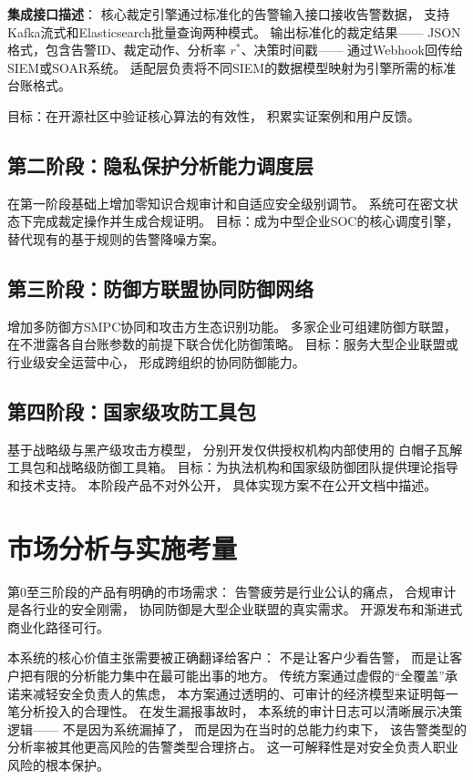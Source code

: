 \documentclass[11pt,a4paper]{article}
\begin{document}
\textbf{集成接口描述}：
核心裁定引擎通过标准化的告警输入接口接收告警数据，
支持Kafka流式和Elasticsearch批量查询两种模式。
输出标准化的裁定结果——
JSON格式，包含告警ID、裁定动作、分析率 \(r^*\)、决策时间戳——
通过Webhook回传给SIEM或SOAR系统。
适配层负责将不同SIEM的数据模型映射为引擎所需的标准台账格式。

目标：在开源社区中验证核心算法的有效性，
积累实证案例和用户反馈。

\subsection{第二阶段：隐私保护分析能力调度层}

在第一阶段基础上增加零知识合规审计和自适应安全级别调节。
系统可在密文状态下完成裁定操作并生成合规证明。
目标：成为中型企业SOC的核心调度引擎，
替代现有的基于规则的告警降噪方案。

\subsection{第三阶段：防御方联盟协同防御网络}

增加多防御方SMPC协同和攻击方生态识别功能。
多家企业可组建防御方联盟，
在不泄露各自台账参数的前提下联合优化防御策略。
目标：服务大型企业联盟或行业级安全运营中心，
形成跨组织的协同防御能力。

\subsection{第四阶段：国家级攻防工具包}

基于战略级与黑产级攻击方模型，
分别开发仅供授权机构内部使用的
白帽子瓦解工具包和战略级防御工具箱。
目标：为执法机构和国家级防御团队提供理论指导和技术支持。
本阶段产品不对外公开，
具体实现方案不在公开文档中描述。

\section{市场分析与实施考量}

第0至三阶段的产品有明确的市场需求：
告警疲劳是行业公认的痛点，
合规审计是各行业的安全刚需，
协同防御是大型企业联盟的真实需求。
开源发布和渐进式商业化路径可行。

本系统的核心价值主张需要被正确翻译给客户：
不是让客户少看告警，
而是让客户把有限的分析能力集中在最可能出事的地方。
传统方案通过虚假的“全覆盖”承诺来减轻安全负责人的焦虑，
本方案通过透明的、可审计的经济模型来证明每一笔分析投入的合理性。
在发生漏报事故时，
本系统的审计日志可以清晰展示决策逻辑——
不是因为系统漏掉了，
而是因为在当时的总能力约束下，
该告警类型的分析率被其他更高风险的告警类型合理挤占。
这一可解释性是对安全负责人职业风险的根本保护。
\end{document}
